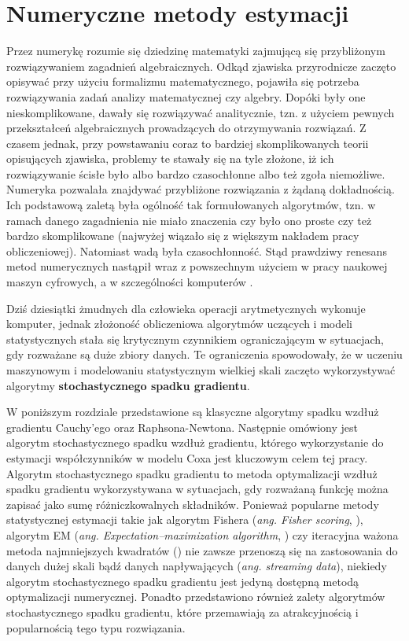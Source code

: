 \chapter{Numeryczne metody estymacji}\label{numPAJ}

Przez numerykę rozumie się dziedzinę matematyki
zajmującą się przybliżonym rozwiązywaniem zagadnień algebraicznych. Odkąd zjawiska przyrodnicze zaczęto opisywać przy użyciu formalizmu matematycznego,
pojawiła się potrzeba rozwiązywania zadań analizy matematycznej czy algebry. Dopóki były
one nieskomplikowane, dawały się rozwiązywać analitycznie, tzn. z użyciem pewnych
przekształceń algebraicznych prowadzących do otrzymywania rozwiązań. Z czasem jednak, przy powstawaniu coraz to bardziej skomplikowanych teorii
opisujących zjawiska, problemy te stawały się na tyle złożone, iż ich rozwiązywanie ścisłe
było albo bardzo czasochłonne albo też zgoła niemożliwe. Numeryka pozwalała znajdywać
przybliżone rozwiązania z żądaną dokładnością. Ich podstawową zaletą była ogólność tak
formułowanych algorytmów, tzn. w ramach danego zagadnienia nie miało znaczenia czy było
ono proste czy też bardzo skomplikowane (najwyżej wiązało się z większym nakładem pracy
obliczeniowej). Natomiast wadą była czasochłonność. Stąd prawdziwy renesans metod
numerycznych nastąpił wraz z powszechnym użyciem w pracy naukowej maszyn cyfrowych,
a w szczególności komputerów \cite{milewski}. 

Dziś dziesiątki żmudnych dla człowieka operacji
arytmetycznych wykonuje komputer, jednak złożoność obliczeniowa algorytmów uczących i modeli statystycznych stała się krytycznym czynnikiem ograniczającym w sytuacjach, gdy rozważane są duże zbiory danych. Te ograniczenia spowodowały, że w uczeniu maszynowym i modelowaniu statystycznym wielkiej skali zaczęto wykorzystywać algorytmy \textbf{stochastycznego spadku gradientu}. 

W poniższym rozdziale przedstawione są klasyczne algorytmy spadku wzdłuż gradientu Cauchy'ego oraz Raphsona-Newtona. Następnie omówiony jest algorytm stochastycznego spadku wzdłuż gradientu, którego wykorzystanie do estymacji współczynników w modelu Coxa jest kluczowym celem tej pracy. Algorytm stochastycznego spadku gradientu to metoda optymalizacji wzdłuż spadku gradientu wykorzystywana w sytuacjach, gdy rozważaną funkcję można zapisać jako sumę różniczkowalnych składników. Ponieważ popularne metody statystycznej estymacji takie jak algorytm Fishera (\textit{ang. Fisher scoring}, \cite{fisher3}), algorytm EM (\textit{ang. Expectation–maximization algorithm}, \cite{dempster}) czy iteracyjna ważona metoda najmniejszych kwadratów (\cite{greenPJ}) nie zawsze przenoszą się na zastosowania do danych dużej skali bądź danych napływających (\textit{ang. streaming data}), niekiedy algorytm stochastycznego spadku gradientu jest jedyną dostępną metodą optymalizacji numerycznej. Ponadto przedstawiono również zalety algorytmów stochastycznego spadku gradientu, które przemawiają za atrakcyjnością i popularnością tego typu rozwiązania. 

